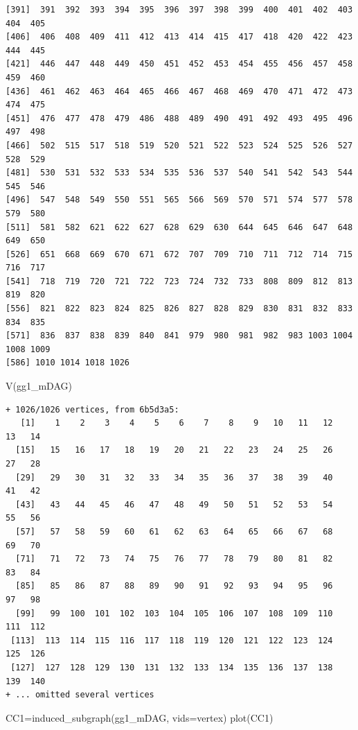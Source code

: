 \documentclass[
  letterpaper,
  DIV=11,
  numbers=noendperiod]{scrreprt}
\newenvironment{Shaded}{\begin{snugshade}}{\end{snugshade}}
\newcommand{\AttributeTok}[1]{\textcolor[rgb]{0.40,0.45,0.13}{#1}}
\newcommand{\FunctionTok}[1]{\textcolor[rgb]{0.28,0.35,0.67}{#1}}
\newcommand{\NormalTok}[1]{\textcolor[rgb]{0.00,0.23,0.31}{#1}}
\newcommand{\OtherTok}[1]{\textcolor[rgb]{0.00,0.23,0.31}{#1}}
\begin{document}
\begin{verbatim}
[391]  391  392  393  394  395  396  397  398  399  400  401  402  403  404  405
[406]  406  408  409  411  412  413  414  415  417  418  420  422  423  444  445
[421]  446  447  448  449  450  451  452  453  454  455  456  457  458  459  460
[436]  461  462  463  464  465  466  467  468  469  470  471  472  473  474  475
[451]  476  477  478  479  486  488  489  490  491  492  493  495  496  497  498
[466]  502  515  517  518  519  520  521  522  523  524  525  526  527  528  529
[481]  530  531  532  533  534  535  536  537  540  541  542  543  544  545  546
[496]  547  548  549  550  551  565  566  569  570  571  574  577  578  579  580
[511]  581  582  621  622  627  628  629  630  644  645  646  647  648  649  650
[526]  651  668  669  670  671  672  707  709  710  711  712  714  715  716  717
[541]  718  719  720  721  722  723  724  732  733  808  809  812  813  819  820
[556]  821  822  823  824  825  826  827  828  829  830  831  832  833  834  835
[571]  836  837  838  839  840  841  979  980  981  982  983 1003 1004 1008 1009
[586] 1010 1014 1018 1026
\end{verbatim}

\begin{Shaded}
\begin{Highlighting}[]
\FunctionTok{V}\NormalTok{(gg1\_mDAG)}
\end{Highlighting}
\end{Shaded}

\begin{verbatim}
+ 1026/1026 vertices, from 6b5d3a5:
   [1]    1    2    3    4    5    6    7    8    9   10   11   12   13   14
  [15]   15   16   17   18   19   20   21   22   23   24   25   26   27   28
  [29]   29   30   31   32   33   34   35   36   37   38   39   40   41   42
  [43]   43   44   45   46   47   48   49   50   51   52   53   54   55   56
  [57]   57   58   59   60   61   62   63   64   65   66   67   68   69   70
  [71]   71   72   73   74   75   76   77   78   79   80   81   82   83   84
  [85]   85   86   87   88   89   90   91   92   93   94   95   96   97   98
  [99]   99  100  101  102  103  104  105  106  107  108  109  110  111  112
 [113]  113  114  115  116  117  118  119  120  121  122  123  124  125  126
 [127]  127  128  129  130  131  132  133  134  135  136  137  138  139  140
+ ... omitted several vertices
\end{verbatim}

\begin{Shaded}
\begin{Highlighting}[]
\NormalTok{CC1}\OtherTok{=}\FunctionTok{induced\_subgraph}\NormalTok{(gg1\_mDAG, }\AttributeTok{vids=}\NormalTok{vertex)}
\FunctionTok{plot}\NormalTok{(CC1)}
\end{Highlighting}
\end{Shaded}
\end{document}
